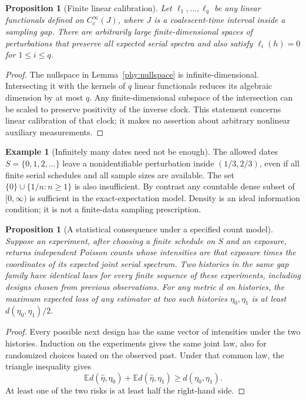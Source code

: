 \documentclass[11pt]{article}
\newtheorem{proposition}[theorem]{Proposition}
\theoremstyle{definition}
\newtheorem{example}[theorem]{Example}
\theoremstyle{remark}
\newcommand{\E}{\mathbb E}
\numberwithin{equation}{section}
\begin{document}
\begin{proposition}[Finite linear calibration]
\label{prop:calibration}
Let $\ell_1,\ldots,\ell_q$ be any linear functionals defined on
$C_c^\infty(J)$, where $J$ is a coalescent-time interval inside a
sampling gap. There are arbitrarily large finite-dimensional spaces
of perturbations that preserve all expected serial spectra and also
satisfy $\ell_i(h)=0$ for $1\le i\le q$.
\end{proposition}
\begin{proof}
The nullspace in Lemma~\ref{phy:nullspace} is infinite-dimensional.
Intersecting it with the kernels of $q$ linear functionals reduces its
algebraic dimension by at most $q$. Any finite-dimensional subspace of
the intersection can be scaled to preserve positivity of the inverse
clock. This statement concerns linear calibration of that clock;
it makes no assertion about arbitrary nonlinear auxiliary measurements.
\end{proof}

\begin{example}[Infinitely many dates need not be enough]
The allowed dates $S=\{0,1,2,\ldots\}$ leave a nonidentifiable
perturbation inside $(1/3,2/3)$, even if all finite serial schedules
and all sample sizes are available. The set
$\{0\}\cup\{1/n:n\ge1\}$ is also insufficient. By contrast any
countable dense subset of $[0,\infty)$ is sufficient in the
exact-expectation model. Density is an ideal information condition;
it is not a finite-data sampling prescription.
\end{example}

\begin{proposition}[A statistical consequence under a specified count model]
\label{prop:poisson}
Suppose an experiment, after choosing a finite schedule on $S$ and
an exposure, returns independent Poisson counts whose intensities
are that exposure times the coordinates of its expected joint serial
spectrum. Two histories in the same gap family have identical laws
for every finite sequence of these experiments, including designs
chosen from previous observations. For any metric $d$ on histories,
the maximum expected loss of any estimator at two such histories
$\eta_0,\eta_1$ is at least $d(\eta_0,\eta_1)/2$.
\end{proposition}
\begin{proof}
Every possible next design has the same vector of intensities under the
two histories. Induction on the experiments gives the same joint law,
also for randomized choices based on the observed past. Under that common
law, the triangle inequality gives
\[
 \E d(\widehat\eta,\eta_0)+\E d(\widehat\eta,\eta_1)
 \ge d(\eta_0,\eta_1).
\]
At least one of the two risks is at least half the right-hand side.
\end{proof}
\end{document}
